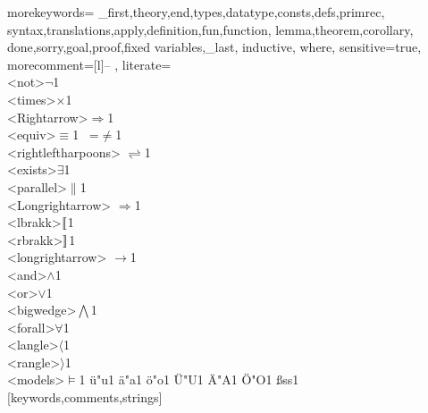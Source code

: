 
\usepackage{amsmath}
\usepackage{amsfonts}
\usepackage{amssymb}
\usepackage{mathtools}
\usepackage{caption}

\usepackage{verbatim}
\usepackage{pstricks,pst-node}
\usepackage{fancyvrb}
\usepackage{listings}
\newcommand{\nsubset}{\not\subset}
\newcommand{\setB}{{\mathord{\mathbb B}}}
\newcommand{\setC}{{\mathord{\mathbb C}}}
\newcommand{\setN}{{\mathord{\mathbb N}}}
\newcommand{\setQ}{{\mathord{\mathbb Q}}}
\newcommand{\setR}{{\mathord{\mathbb R}}}
\newcommand{\setZ}{{\mathord{\mathbb Z}}}
\newcommand{\coloncolon}{\mathrel{::}}
\newcommand{\lsemantics}{\mathopen{\lbrack\mkern-3mu\lbrack}}
\newcommand{\rsemantics}{\mathclose{\rbrack\mkern-3mu\rbrack}}
\newcommand{\lcata}{\mathopen{(\mkern-3mu\mid}}
\newcommand{\rcata}{\mathclose{\mid\mkern-3mu)}}

%
  {morekeywords={
        _first,theory,end,types,datatype,consts,defs,primrec,
        syntax,translations,apply,definition,fun,function, lemma,theorem,corollary,
        done,sorry,goal,proof,fixed variables,_last, inductive, where},
        sensitive=true,
        morecomment=[l]{-- },
        literate=
                {\\<not>}{{$¬$}}1 {\\<times>}{{$×$}}1                 
                {\\<Rightarrow>}{{$\Rightarrow$}}1%
                {\\<equiv>}{{$\equiv$}}1 {~=}{{$\not=$}}1                         
                {\\<rightleftharpoons>}
                        {{$\rightleftharpoons$}}1
                {\\<exists>}{{$\exists$}}1
                {\\<parallel>}{{$\parallel$}}1
                {\\<Longrightarrow>}
                        {{$\Longrightarrow$}}1
                 {\\<lbrakk>}{{$\lsemantics$}}1
                {\\<rbrakk>}{{$\rsemantics$}}1
                {\\<longrightarrow>}
                        {{$\longrightarrow$}}1
                {\\<and>}{{$\land$}}1
                {\\<or>}{{$\lor$}}1
                {\\<bigwedge>}{{$\bigwedge$}}1
                {\\<forall>}{{$\forall$}}1
                {\\<langle>}{{$\langle$}}1
                {\\<rangle>}{{$\rangle$}}1
                {\\<models>}{{$\models$}}1
                {ü}{"u}1 {ä}{"a}1 {ö}{"o}1
                {Ü}{"U}1 {Ä}{"A}1 {Ö}{"O}1 {ß}{{ss}}1
  }[keywords,comments,strings]%

